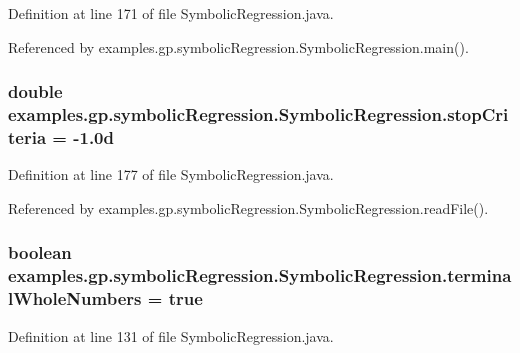Definition at line 171 of file Symbolic\-Regression.\-java.



Referenced by examples.\-gp.\-symbolic\-Regression.\-Symbolic\-Regression.\-main().

\hypertarget{classexamples_1_1gp_1_1symbolic_regression_1_1_symbolic_regression_a88585957d820cb0d8606b8975d3da984}{
\subsubsection[{stop\-Criteria}]{\setlength{\rightskip}{0pt plus 5cm}double examples.\-gp.\-symbolic\-Regression.\-Symbolic\-Regression.\-stop\-Criteria = -\/1.\-0d\hspace{0.3cm}{\ttfamily [static]}}}\label{classexamples_1_1gp_1_1symbolic_regression_1_1_symbolic_regression_a88585957d820cb0d8606b8975d3da984}


Definition at line 177 of file Symbolic\-Regression.\-java.



Referenced by examples.\-gp.\-symbolic\-Regression.\-Symbolic\-Regression.\-read\-File().

\hypertarget{classexamples_1_1gp_1_1symbolic_regression_1_1_symbolic_regression_afae4503335c172014bb58d7adfd35d3f}{
\subsubsection[{terminal\-Whole\-Numbers}]{\setlength{\rightskip}{0pt plus 5cm}boolean examples.\-gp.\-symbolic\-Regression.\-Symbolic\-Regression.\-terminal\-Whole\-Numbers = true\hspace{0.3cm}{\ttfamily [static]}}}\label{classexamples_1_1gp_1_1symbolic_regression_1_1_symbolic_regression_afae4503335c172014bb58d7adfd35d3f}


Definition at line 131 of file Symbolic\-Regression.\-java.



